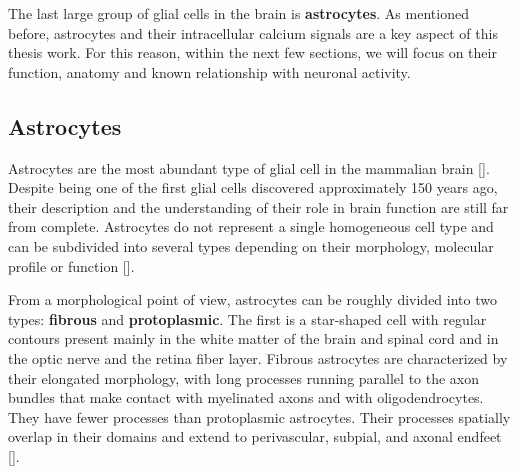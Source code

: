 The last large group of glial cells in the brain is \textbf{astrocytes}.
As mentioned before, astrocytes and their intracellular calcium signals are a key aspect of this thesis work. 
For this reason, within the next few sections, we will focus on their function, anatomy and known relationship with neuronal activity. 

\subsection{Astrocytes}
\label{chap1:sec:2:subsec1:astrocytes}
Astrocytes are the most abundant type of glial cell in the mammalian brain [\cite{herculano2014}].
Despite being one of the first glial cells discovered approximately 150 years ago, their description and the understanding of their role in brain function are still far from complete.
Astrocytes do not represent a single homogeneous cell type and can be subdivided into several types depending on their morphology, molecular profile or function [\cite{batiuk2020}]. 

From a morphological point of view, astrocytes can be roughly divided into two types: \textbf{fibrous} and \textbf{protoplasmic}.
The first is a star-shaped cell with regular contours present mainly in the white matter of the brain and spinal cord and in the optic nerve and the retina fiber layer.
Fibrous astrocytes are characterized by their elongated morphology, with long processes running parallel to the axon bundles that make contact with myelinated axons and with oligodendrocytes.
They have fewer processes than protoplasmic astrocytes.
Their processes spatially overlap in their domains and extend to perivascular, subpial, and axonal endfeet [\cite{lundgaard2014white}].


